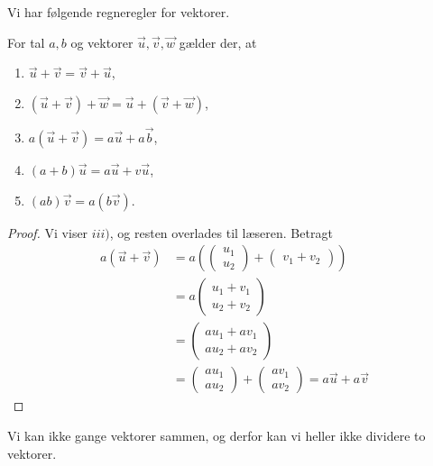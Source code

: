 Vi har følgende regneregler for vektorer.
\begin{setn}\label{setn:regneregler}
For tal $a,b$ og vektorer $\vec{u},\vec{v},\vec{w}$ gælder der, at 
\begin{enumerate}[label=\roman*)]
\item $\vec{u} + \vec{v} = \vec{v}+\vec{u}$,
\item $(\vec{u} + \vec{v}) +\vec{w} = \vec{u} + (\vec{v} + \vec{w})$,
\item $a(\vec{u}+\vec{v}) = a\vec{u}+a\vec{b}$,
\item $(a+b)\vec{u} = a\vec{u}+ v\vec{u}$,
\item $(ab)\vec{v} = a(b\vec{v})$.
\end{enumerate}
\end{setn}
\begin{proof}
Vi viser $iii)$, og resten overlades til læseren. Betragt
\begin{align*}
a(\vec{u}+\vec{v}) &= a\left(\begin{pmatrix}
u_1\\u_2
\end{pmatrix}+ \begin{pmatrix}v_1 + v_2
\end{pmatrix} \right) \\
 &= a\begin{pmatrix}
u_1+v_1\\ u_2+v_2
\end{pmatrix}\\
 &= \begin{pmatrix}
au_1+av_1 \\ au_2+av_2
\end{pmatrix}\\
&= \begin{pmatrix}
au_1\\ au_2
\end{pmatrix} + \begin{pmatrix}
av_1\\ av_2
\end{pmatrix} = a\vec{u} + a\vec{v}
\end{align*}
\end{proof}
Vi kan ikke gange vektorer sammen, og derfor kan vi heller ikke dividere to vektorer. 

